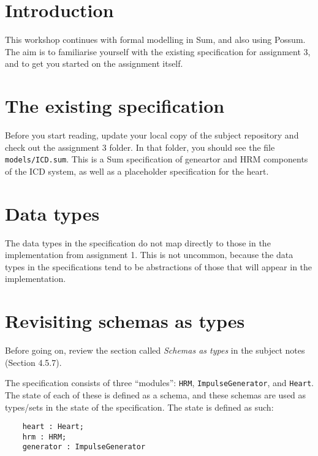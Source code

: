 \documentclass{article}
\begin{document}
%
\lstset{language=,aboveskip=3mm}

\section*{Introduction}

This workshop continues with formal modelling in Sum, and also using Possum. The aim is to familiarise yourself with the existing specification for assignment 3, and to get you started on the assignment itself.

\section*{The existing specification}

Before you start reading, update your local copy of the subject repository and check out the assignment 3 folder. In that folder, you should see the file \texttt{models/ICD.sum}. This is a Sum specification of geneartor and HRM components of the ICD system, as well as a placeholder specification for the heart.

\section*{Data types}

The data types in the specification do not map directly to those in the implementation from assignment 1. This is not uncommon, because the data types in the specifications tend to be abstractions of those that will appear in the implementation.


\section*{Revisiting schemas as types}

Before going on, review the section called \emph{Schemas as types} in the subject notes (Section 4.5.7).

The specification consists of three ``modules'': \texttt{HRM}, \texttt{ImpulseGenerator}, and \texttt{Heart}. The state of each of these is defined as a schema, and these schemas are used as types/sets in the state of the specification. The state is defined as such:

\begin{lstlisting}
    heart : Heart;
    hrm : HRM;
    generator : ImpulseGenerator
\end{lstlisting}
\end{document}
